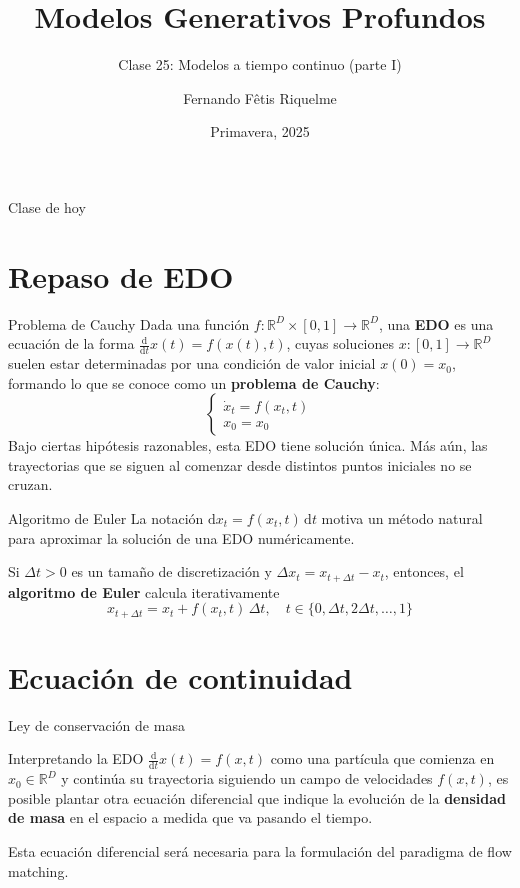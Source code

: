 \documentclass{beamer}
\title{Modelos Generativos Profundos}
\subtitle{Clase 25: Modelos a tiempo continuo (parte I)}
\author{Fernando Fêtis Riquelme}
\institute{
    Facultad de Ciencias Físicas y Matemáticas\\
    Universidad de Chile
}
\date{Primavera, 2025}
\newcommand{\R}{\mathbb{R}}
\begin{document}
\begin{frame}
    \titlepage
\end{frame}

\begin{frame}{Clase de hoy}
    \tableofcontents
\end{frame}

\section{Repaso de EDO}

\begin{frame}{Problema de Cauchy}
    Dada una función $f:\R^D\times[0,1]\to\R^D$, una \textbf{EDO} es una ecuación de la forma $\frac{\text{d}}{\text{d}t}x(t)=f(x(t),t)$, cuyas soluciones $x:[0,1]\to\R^D$ suelen estar determinadas por una condición de valor inicial $x(0)=x_0$, formando lo que se conoce como un \textbf{problema de Cauchy}:
    \begin{equation*}
        \begin{cases}
\dot x_t=f\left(x_t,t\right)\\
x_0=x_0
\end{cases}
    \end{equation*}
    Bajo ciertas hipótesis razonables, esta EDO tiene solución única. Más aún, las trayectorias que se siguen al comenzar desde distintos puntos iniciales no se cruzan.
\end{frame}

\begin{frame}{Algoritmo de Euler}
    La notación $\text{d}x_t=f(x_t,t)\,\text{d}t$ motiva un método natural para aproximar la solución de una EDO numéricamente.

    Si $\Delta t>0$ es un tamaño de discretización y $\Delta x_t=x_{t+\Delta t}-x_t$, entonces, el \textbf{algoritmo de Euler} calcula iterativamente
    \begin{equation*}
        x_{t+\Delta t}=x_t+f(x_t,t)\,\Delta t,
\quad t\in\{0,\Delta t,2\Delta t,\ldots,1\}
    \end{equation*}
\end{frame}


\section{Ecuación de continuidad}


\begin{frame}{Ley de conservación de masa}

    Interpretando la EDO $\frac{\text{d}}{\text{d}t}x(t)=f(x,t)$ como una partícula que comienza en $x_0\in\R^D$ y continúa su trayectoria siguiendo un campo de velocidades $f(x,t)$,  es posible plantar otra ecuación diferencial que indique la evolución de la \textbf{densidad de masa} en el espacio a medida que va pasando el tiempo.

    Esta ecuación diferencial será necesaria para la formulación del paradigma de flow matching.
    
\end{frame}
\end{document}
